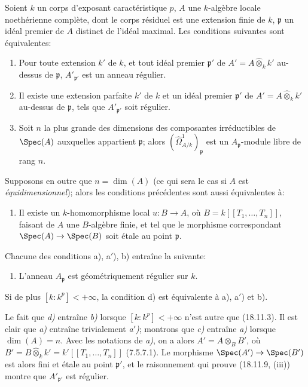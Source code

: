 \begin{theorem}[18.11.10]
\label{IV.18.11.10}
Soient $k$ un corps d'exposant caractéristique $p$, $A$ une $k$-algèbre locale noethérienne complète, dont le corps résiduel est une extension finie de $k$, $\mathfrak p$ un idéal premier de $A$ distinct de l'idéal maximal. Les conditions suivantes sont équivalentes:
\begin{enumerate}
  \item[\textup{a)}] Pour toute extension $k'$ de $k$, et tout idéal premier $\mathfrak p'$ de $A'=A\widehat{\otimes}_k k'$ au-dessus de $\mathfrak p$, $A'_{\mathfrak p'}$ est un anneau régulier.
  \item[\textup{a$'$)}] Il existe une extension \textup{parfaite} $k'$ de $k$ et un idéal premier $\mathfrak p'$ de $A'=A\widehat{\otimes}_k k'$ au-dessus de $\mathfrak p$, tels que $A'_{\mathfrak p'}$ soit régulier.
  \item[\textup{b)}] Soit $n$ la plus grande des dimensions des composantes irréductibles de $\Spec(A)$ auxquelles appartient $\mathfrak p$; alors $(\hat{\Omega}^1_{A/k})_{\mathfrak p}$ est un $A_{\mathfrak p}$-module libre de rang $n$.
\end{enumerate}

Supposons en outre que $n=\dim(A)$ \textup{(ce qui sera le cas si $A$ est \emph{équidimensionnel})}; alors les conditions précédentes sont aussi équivalentes à:
\begin{enumerate}
  \item[\textup{c)}] Il existe un $k$-homomorphisme local $u:B\to A$, où $B=k[[T_1,\ldots,T_n]]$, faisant de $A$ une $B$-algèbre finie, et tel que le morphisme correspondant $\Spec(A)\to\Spec(B)$ soit étale au point $\mathfrak p$.
\end{enumerate}

Chacune des conditions \textup{a), a$'$), b)} entraîne la suivante:
\begin{enumerate}
  \item[\textup{d)}] L'anneau $A_{\mathfrak p}$ est géométriquement régulier sur $k$.
\end{enumerate}

Si de plus $[k:k^p]<+\infty$, la condition \textup{d)} est équivalente à \textup{a), a$'$)} et \textup{b)}.
\end{theorem}

Le fait que \emph{d)} entraîne \emph{b)} lorsque $[k:k^p]<+\infty$ n'est autre que (18.11.3). Il est clair que \emph{a)} entraîne trivialement \emph{a$'$)}; montrons que \emph{c)} entraîne \emph{a)} lorsque $\dim(A)=n$. Avec les notations de \emph{a)}, on a alors
$A'=A\otimes_B B'$, où $B'=B\widehat{\otimes}_k k'=k'[[T_1,\ldots,T_n]]$
(7.5.7.1). Le morphisme $\Spec(A')\to\Spec(B')$ est alors fini et étale au point $\mathfrak p'$, et le raisonnement qui prouve (18.11.9, (iii)) montre que $A'_{\mathfrak p'}$ est régulier.

